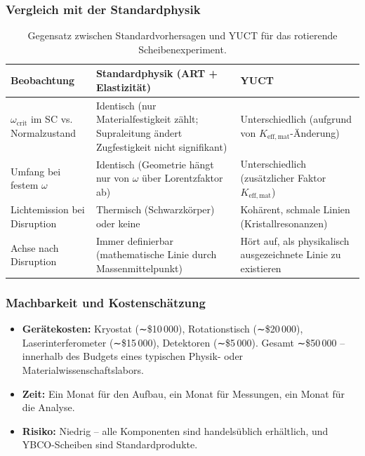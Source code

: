 \documentclass[12pt,a4paper]{article}
\begin{document}
	\subsubsection{Vergleich mit der Standardphysik}
	
	\begin{table}[h]
		\centering
		\caption{Gegensatz zwischen Standardvorhersagen und YUCT für das rotierende Scheibenexperiment.}
		\label{tab:experiment_predictions}
		\begin{tabular}{p{5cm}p{4cm}p{4cm}}
			\toprule
			\textbf{Beobachtung} & \textbf{Standardphysik (ART + Elastizität)} & \textbf{YUCT} \\
			\midrule
			\(\omega_{\text{crit}}\) im SC vs. Normalzustand & Identisch (nur Materialfestigkeit zählt; Supraleitung ändert Zugfestigkeit nicht signifikant) & Unterschiedlich (aufgrund von \(K_{\mathrm{eff,mat}}\)-Änderung) \\
			Umfang bei festem \(\omega\) & Identisch (Geometrie hängt nur von \(\omega\) über Lorentzfaktor ab) & Unterschiedlich (zusätzlicher Faktor \(K_{\mathrm{eff,mat}}\)) \\
			Lichtemission bei Disruption & Thermisch (Schwarzkörper) oder keine & Kohärent, schmale Linien (Kristallresonanzen) \\
			Achse nach Disruption & Immer definierbar (mathematische Linie durch Massenmittelpunkt) & Hört auf, als physikalisch ausgezeichnete Linie zu existieren \\
			\bottomrule
		\end{tabular}
	\end{table}
	
	\subsubsection{Machbarkeit und Kostenschätzung}
	
	\begin{itemize}
		\item \textbf{Gerätekosten:} Kryostat (∼\$10 000), Rotationstisch (∼\$20 000), Laserinterferometer (∼\$15 000), Detektoren (∼\$5 000). Gesamt ∼\$50 000 – innerhalb des Budgets eines typischen Physik- oder Materialwissenschaftslabors.
		\item \textbf{Zeit:} Ein Monat für den Aufbau, ein Monat für Messungen, ein Monat für die Analyse.
		\item \textbf{Risiko:} Niedrig – alle Komponenten sind handelsüblich erhältlich, und YBCO-Scheiben sind Standardprodukte.
	\end{itemize}
	
\end{document}
